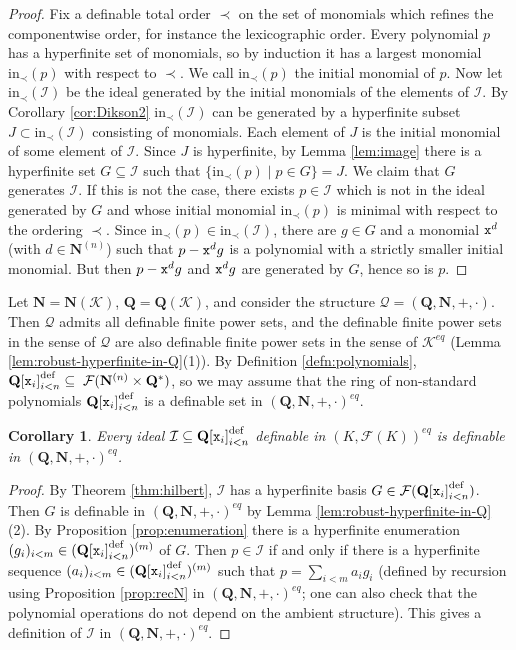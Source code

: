 \documentclass{amsart}
\newcommand{\ca}{\mathcal}
\newcommand{\ideal}[1]{\ca #1}
\theoremstyle{plain}
\newtheorem{cor}[thm]{Corollary}
\theoremstyle{definition}
\newcommand{\F}{\mathcal{F}}
\newcommand{\hn}{\mathbf N}
\newcommand{\hQ}{\mathbf Q}
\newcommand{\poly}[1]{{\hQ[{\tt x}_i]}_{i<#1}^\text{def}}
\begin{document}
\begin{proof}
Fix a definable total order $\prec$ on the set of monomials which refines the componentwise order, for instance the lexicographic order. Every polynomial $p$ has a hyperfinite set of monomials, so by induction it has a largest monomial $\text{in}_\prec (p)$ with respect to $\prec$. We call $\text{in}_\prec (p)$ the initial monomial of $p$. Now let $\text{in}_\prec (\ideal I)$ be the ideal generated by the initial monomials of the elements of $\ideal I$.
By Corollary \ref{cor:Dikson2} $\text{in}_\prec (\ideal I)$ can be generated by a hyperfinite subset $J \subset \text{in}_\prec (\ideal I)$ consisting of monomials. Each element of $J$ is the initial monomial of some element of $\ideal I$.  
Since $J$ is hyperfinite, by Lemma \ref{lem:image} there is a hyperfinite set $G\subseteq \ideal I$ such that $\{\text{in}_\prec (p)\mid p\in G\} = J$. 
We claim that $G$ generates $\ideal I$. If this is not the case, there exists $p\in \ideal I$ which is not in the ideal generated by $G$ and whose initial monomial $\text{in}_\prec (p)$ is minimal with respect to the ordering $\prec$. Since $\text{in}_\prec(p) \in \text{in}_\prec(\ideal I)$, there are $g\in G$ and a monomial ${\tt x}^d$ (with  $d\in \hn^{(n)}$) such that $p-{\tt x}^d g$ is a polynomial with a strictly smaller initial monomial. But then $p - {\tt x}^d g$ and ${\tt x}^d g$ are generated by $G$, hence so is $p$.  
\end{proof}

Let $\hn = \hn(\ca K)$, $\hQ= \hQ(\ca K)$, and consider the structure $\ca Q = (\hQ, \hn, +, \cdot)$. Then $\ca Q$ admits all definable finite power sets, and the definable finite power sets in the sense of $\ca Q$ are also definable finite power sets in the sense of $\ca K^{eq}$ (Lemma \ref{lem:robust-hyperfinite-in-Q}(1)). By Definition \ref{defn:polynomials}, $\poly n  \subseteq \; \F(\hn^{(n)} \times \hQ^*)$, so we may assume that the ring of non-standard polynomials $\poly n$ is a definable set in $(\hQ,\hn,+,\cdot)^{eq}$.

\begin{cor} \label{cor:ideal}  
Every ideal $\ideal I \subseteq \poly n$ definable in $(K, \F(K))^{eq}$ is definable in $(\hQ, \hn,+,\cdot)^{eq}$. 
\end{cor} 

\begin{proof}
By Theorem \ref{thm:hilbert}, $\ideal I$ has a hyperfinite basis $G\in \F(\poly n)$. Then $G$ is definable in $(\hQ, \hn, +, \cdot)^{eq}$ by Lemma \ref{lem:robust-hyperfinite-in-Q}(2). By Proposition \ref{prop:enumeration} there is a hyperfinite enumeration $(g_i)_{i<m} \in  (\poly n)^{(m)}$ of $G$. Then $p\in \ideal I$ if and only if there is a hyperfinite sequence $(a_i)_{ i<m}\in (\poly n)^{(m)}$ such that $p = \sum_{i<m}a_i g_i$ (defined by recursion using Proposition \ref{prop:recN} in $(\hQ, \hn, +,\cdot)^{eq}$; one can also check that the polynomial operations do not depend on the ambient structure). This gives a definition of $\ideal I$ in $(\hQ, \hn,+,\cdot)^{eq}$. 
\end{proof}
\end{document}
